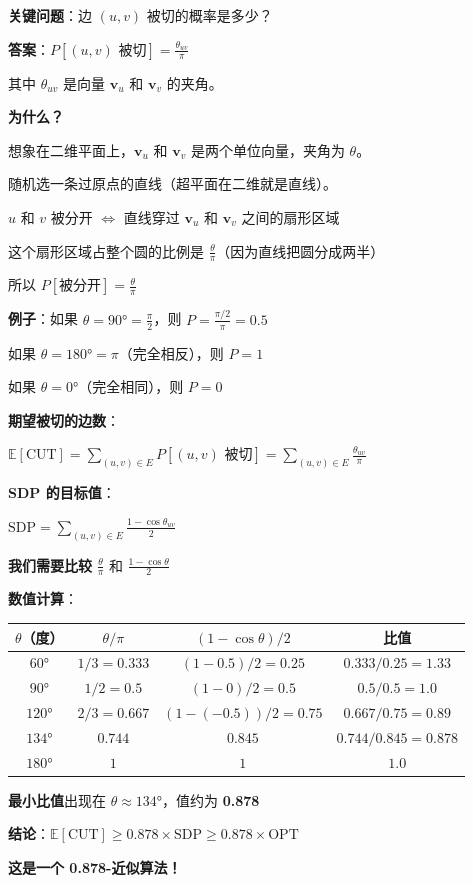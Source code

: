 \documentclass[12pt, a4paper]{ctexart}
\begin{document}
\begin{blackboard}[分析：边被切的概率]

\textbf{关键问题}：边 $(u, v)$ 被切的概率是多少？

\textbf{答案}：$P[(u,v) \text{ 被切}] = \frac{\theta_{uv}}{\pi}$

其中 $\theta_{uv}$ 是向量 $\mathbf{v}_u$ 和 $\mathbf{v}_v$ 的夹角。

\textbf{为什么？}

想象在二维平面上，$\mathbf{v}_u$ 和 $\mathbf{v}_v$ 是两个单位向量，夹角为 $\theta$。

随机选一条过原点的直线（超平面在二维就是直线）。

$u$ 和 $v$ 被分开 $\Leftrightarrow$ 直线穿过 $\mathbf{v}_u$ 和 $\mathbf{v}_v$ 之间的扇形区域

这个扇形区域占整个圆的比例是 $\frac{\theta}{\pi}$（因为直线把圆分成两半）

所以 $P[\text{被分开}] = \frac{\theta}{\pi}$

\textbf{例子}：如果 $\theta = 90° = \frac{\pi}{2}$，则 $P = \frac{\pi/2}{\pi} = 0.5$

如果 $\theta = 180° = \pi$（完全相反），则 $P = 1$

如果 $\theta = 0°$（完全相同），则 $P = 0$

\end{blackboard}

\begin{blackboard}[0.878 近似比的来源]

\textbf{期望被切的边数}：

$\mathbb{E}[\text{CUT}] = \sum_{(u,v) \in E} P[(u,v) \text{ 被切}] = \sum_{(u,v) \in E} \frac{\theta_{uv}}{\pi}$

\textbf{SDP 的目标值}：

$\text{SDP} = \sum_{(u,v) \in E} \frac{1 - \cos\theta_{uv}}{2}$

\textbf{我们需要比较} $\frac{\theta}{\pi}$ 和 $\frac{1 - \cos\theta}{2}$

\textbf{数值计算}：

\begin{center}
\begin{tabular}{c|c|c|c}
$\theta$（度） & $\theta/\pi$ & $(1-\cos\theta)/2$ & 比值 \\
\hline
$60°$ & $1/3 = 0.333$ & $(1-0.5)/2 = 0.25$ & $0.333/0.25 = 1.33$ \\
$90°$ & $1/2 = 0.5$ & $(1-0)/2 = 0.5$ & $0.5/0.5 = 1.0$ \\
$120°$ & $2/3 = 0.667$ & $(1-(-0.5))/2 = 0.75$ & $0.667/0.75 = 0.89$ \\
$134°$ & $0.744$ & $0.845$ & $0.744/0.845 = \mathbf{0.878}$ \\
$180°$ & $1$ & $1$ & $1.0$
\end{tabular}
\end{center}

\textbf{最小比值}出现在 $\theta \approx 134°$，值约为 \textbf{0.878}

\textbf{结论}：$\mathbb{E}[\text{CUT}] \geq 0.878 \times \text{SDP} \geq 0.878 \times \text{OPT}$

\textbf{这是一个 0.878-近似算法！}

\end{blackboard}
\end{document}
